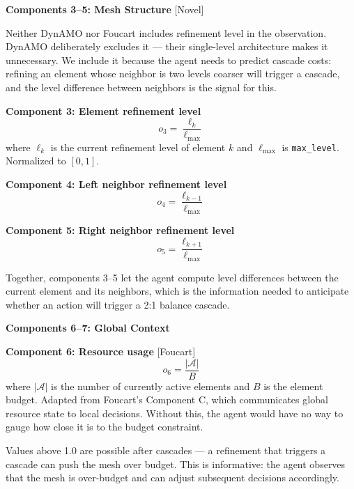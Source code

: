 \documentclass[11pt]{article}
\newcommand{\provfoucart}{\textcolor{foucart}{\textsf{[Foucart]}}}
\newcommand{\provnovel}{\textcolor{novel}{\textsf{[Novel]}}}
\begin{document}
\vspace{0.5cm}
\noindent\textbf{Components 3--5: Mesh Structure} \provnovel

\vspace{0.15cm}
\noindent Neither DynAMO nor Foucart includes refinement level in the observation. DynAMO deliberately excludes it --- their single-level architecture makes it unnecessary. We include it because the agent needs to predict cascade costs: refining an element whose neighbor is two levels coarser will trigger a cascade, and the level difference between neighbors is the signal for this.

\vspace{0.2cm}
\noindent\textbf{Component 3: Element refinement level}
\[
o_3 = \frac{\ell_k}{\ell_{\max}}
\]
where $\ell_k$ is the current refinement level of element $k$ and $\ell_{\max}$ is \texttt{max\_level}. Normalized to $[0, 1]$.

\vspace{0.3cm}
\noindent\textbf{Component 4: Left neighbor refinement level}
\[
o_4 = \frac{\ell_{k-1}}{\ell_{\max}}
\]

\vspace{0.3cm}
\noindent\textbf{Component 5: Right neighbor refinement level}
\[
o_5 = \frac{\ell_{k+1}}{\ell_{\max}}
\]

\noindent Together, components 3--5 let the agent compute level differences between the current element and its neighbors, which is the information needed to anticipate whether an action will trigger a 2:1 balance cascade.

\vspace{0.5cm}
\noindent\textbf{Components 6--7: Global Context}

\vspace{0.2cm}
\noindent\textbf{Component 6: Resource usage} \provfoucart
\[
o_6 = \frac{|\mathcal{A}|}{B}
\]
where $|\mathcal{A}|$ is the number of currently active elements and $B$ is the element budget. Adapted from Foucart's Component C, which communicates global resource state to local decisions. Without this, the agent would have no way to gauge how close it is to the budget constraint.

Values above 1.0 are possible after cascades --- a refinement that triggers a cascade can push the mesh over budget. This is informative: the agent observes that the mesh is over-budget and can adjust subsequent decisions accordingly.
\end{document}
